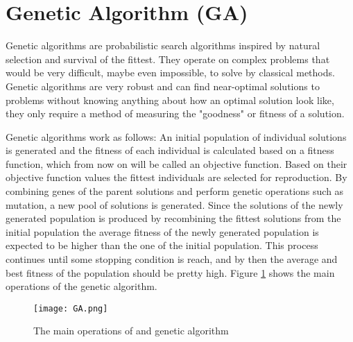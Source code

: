 \documentclass{article}
\begin{document}
\section{Genetic Algorithm (GA)}




Genetic algorithms are probabilistic search algorithms inspired by natural selection and survival of the fittest. They operate on complex problems that would be very difficult, maybe even impossible, to solve by classical methods. Genetic algorithms are very robust and can find near-optimal solutions to problems without knowing anything about how an optimal solution look like, they only require a method of measuring the "goodness" or fitness of a solution.


Genetic algorithms work as follows: An initial population of individual solutions is generated and the fitness of each individual is calculated based on a fitness function, which from now on will be called an objective function. Based on their objective function values the fittest individuals are selected for reproduction. By combining genes of the parent solutions and perform genetic operations such as mutation, a new pool of solutions is generated. Since the solutions of the newly generated population is produced by recombining the fittest solutions from the initial population the average fitness of the newly generated population is expected to be higher than the one of the initial population. This process continues until some stopping condition is reach, and by then the average and best fitness of the population should be pretty high. Figure \ref{GA Flow chart} shows the main operations of the genetic algorithm.


\begin{figure}[h!]
\begin{center}
\texttt{[image: GA.png]}
\caption{The main operations of and genetic algorithm}
\end{center}
\label{GA Flow chart}
\end{figure}


% 
\end{document}
